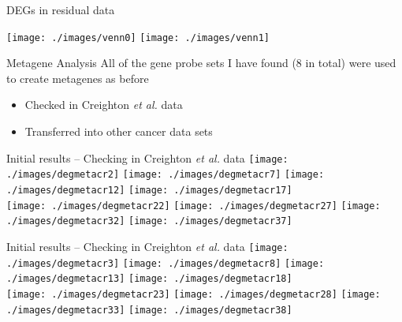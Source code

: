 \documentclass[handout]{beamer}
\begin{document}

\begin{frame}{DEGs in residual data}
	\begin{center}
		\texttt{[image: ./images/venn0]}
		\texttt{[image: ./images/venn1]}
	\end{center}
\end{frame}

\begin{frame}{Metagene Analysis}
	All of the gene probe sets I have found (8 in total) were used to create metagenes as before
	\begin{itemize}
		\item Checked in Creighton \textit{et al.} data
		\item Transferred into other cancer data sets
	\end{itemize}
\end{frame}

\begin{frame}{Initial results -- Checking in Creighton \textit{et al.} data}
	\texttt{[image: ./images/degmetacr2]}
	\texttt{[image: ./images/degmetacr7]}
	\texttt{[image: ./images/degmetacr12]}
	\texttt{[image: ./images/degmetacr17]}\\
	\texttt{[image: ./images/degmetacr22]}
	\texttt{[image: ./images/degmetacr27]}
	\texttt{[image: ./images/degmetacr32]}
	\texttt{[image: ./images/degmetacr37]}
\end{frame}

\begin{frame}{Initial results -- Checking in Creighton \textit{et al.} data}
	\texttt{[image: ./images/degmetacr3]}
	\texttt{[image: ./images/degmetacr8]}
	\texttt{[image: ./images/degmetacr13]}
	\texttt{[image: ./images/degmetacr18]}\\
	\texttt{[image: ./images/degmetacr23]}
	\texttt{[image: ./images/degmetacr28]}
	\texttt{[image: ./images/degmetacr33]}
	\texttt{[image: ./images/degmetacr38]}
\end{frame}
\end{document}
